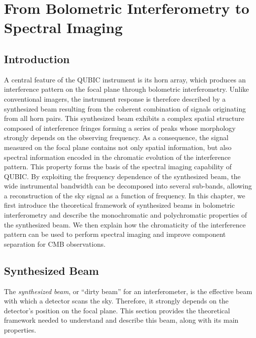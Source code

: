 \documentclass[../../thesis.tex]{subfiles}
\begin{document}
\chapter[Spectral Imaging]{From Bolometric Interferometry to Spectral Imaging} \label{chap:spectral_imaging}

\ifSubfilesClassLoaded{
    \tableofcontents
}{
    \minitoc
}

\section*{Introduction}

A central feature of the QUBIC instrument is its horn array, which produces an interference pattern on the focal plane through bolometric interferometry. Unlike conventional imagers, the instrument response is therefore described by a synthesized beam resulting from the coherent combination of signals originating from all horn pairs.
This synthesized beam exhibits a complex spatial structure composed of interference fringes forming a series of peaks whose morphology strongly depends on the observing frequency. As a consequence, the signal measured on the focal plane contains not only spatial information, but also spectral information encoded in the chromatic evolution of the interference pattern.
This property forms the basis of the spectral imaging capability of QUBIC. By exploiting the frequency dependence of the synthesized beam, the wide instrumental bandwidth can be decomposed into several sub-bands, allowing a reconstruction of the sky signal as a function of frequency.
In this chapter, we first introduce the theoretical framework of synthesized beams in bolometric interferometry and describe the monochromatic and polychromatic properties of the synthesized beam. We then explain how the chromaticity of the interference pattern can be used to perform spectral imaging and improve component separation for CMB observations.

\section{Synthesized Beam}

The \emph{synthesized beam}, or \enquote{dirty beam} for an interferometer, is the effective beam with which a detector scans the sky. Therefore, it strongly depends on the detector's position on the focal plane. This section provides the theoretical framework needed to understand and describe this beam, along with its main properties.
\end{document}
